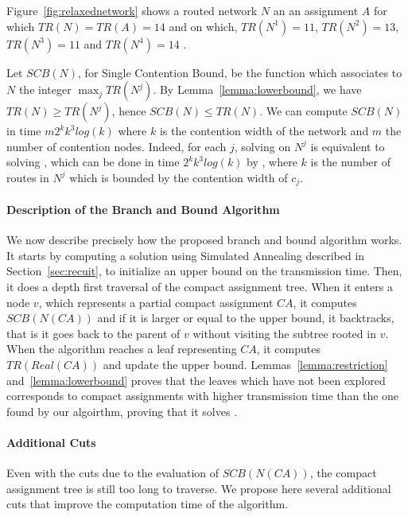 Figure~\ref{fig:relaxednetwork} shows a routed network $N$ an an assignment $A$ for which $TR(N) = TR(A) =14$ and on which, $TR(N^1) = 11$, $TR(N^2) = 13$, $TR(N^3) = 11$ and $TR(N^4) = 14$ .


Let $SCB(N)$, for Single Contention Bound, be the function which associates to $N$ the integer 
$\max_{j} TR(N^j)$. By Lemma~\ref{lemma:lowerbound}, we have $TR(N) \geq TR(N^j)$, hence $SCB(N)\leq TR(N)$.
We can compute $SCB(N)$ in time $m2^kk^3log(k)$ where $k$ is the contention width of the network and $m$ the number 
of contention nodes. Indeed, for each $j$, solving \spall on $N^j$ is equivalent to solving \wta, which can be done
in time $2^kk^3log(k)$ by \ASPMLS, where $k$ is the number of routes in $N^j$ which is bounded by the contention width of $c_j$.


\paragraph{Description of the Branch and Bound Algorithm}

We now describe precisely how the proposed branch and bound algorithm works.
It starts by computing a solution using Simulated Annealing described in Section~\ref{sec:recuit},
to initialize an upper bound on the transmission time.
Then, it does a depth first traversal of the compact assignment tree. 
When it enters a node $v$, which represents a partial compact assignment $CA$, it computes $SCB(N(CA))$ and
if it is larger or equal to the upper bound, it backtracks, that is it goes back to the parent of $v$ without visiting
the subtree rooted in $v$. 
When the algorithm reaches a leaf representing $CA$, it computes $TR(Real(CA))$ and update the upper bound. 
Lemmas~\ref{lemma:restriction} and~\ref{lemma:lowerbound} proves that the leaves which have not been explored corresponds
to compact assignments with higher transmission time than the one found by our algoirthm, proving that it solves \spall.


\paragraph{Additional Cuts}

Even with the cuts due to the evaluation of $SCB(N(CA))$, the compact assignment tree  is still too long to traverse. We propose here several additional cuts that improve the computation time of the algorithm. 

